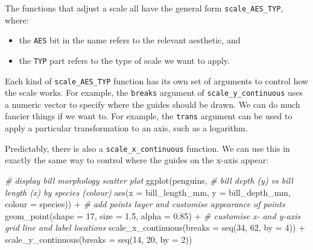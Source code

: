 \documentclass[
]{book}
\newenvironment{Shaded}{\begin{snugshade}}{\end{snugshade}}
\newcommand{\AttributeTok}[1]{\textcolor[rgb]{0.77,0.63,0.00}{#1}}
\newcommand{\CommentTok}[1]{\textcolor[rgb]{0.56,0.35,0.01}{\textit{#1}}}
\newcommand{\DecValTok}[1]{\textcolor[rgb]{0.00,0.00,0.81}{#1}}
\newcommand{\FloatTok}[1]{\textcolor[rgb]{0.00,0.00,0.81}{#1}}
\newcommand{\FunctionTok}[1]{\textcolor[rgb]{0.00,0.00,0.00}{#1}}
\newcommand{\NormalTok}[1]{#1}
\newcommand{\SpecialCharTok}[1]{\textcolor[rgb]{0.00,0.00,0.00}{#1}}
\providecommand{\tightlist}{%
  \setlength{\itemsep}{0pt}\setlength{\parskip}{0pt}}
\begin{document}
The functions that adjust a scale all have the general form \texttt{scale\_AES\_TYP}, where:

\begin{itemize}
\tightlist
\item
  the \texttt{AES} bit in the name refers to the relevant aesthetic, and
\item
  the \texttt{TYP} part refers to the type of scale we want to apply.
\end{itemize}

Each kind of \texttt{scale\_AES\_TYP} function has its own set of arguments to control how the scale works. For example, the \texttt{breaks} argument of \texttt{scale\_y\_continuous} uses a numeric vector to specify where the guides should be drawn. We can do much fancier things if we want to. For example, the \texttt{trans} argument can be used to apply a particular transformation to an axis, such as a logarithm.

Predictably, there is also a \texttt{scale\_x\_continuous} function. We can use this in exactly the same way to control where the guides on the x-axis appear:

\begin{Shaded}
\begin{Highlighting}[]
\CommentTok{\# display bill morphology scatter plot}
\FunctionTok{ggplot}\NormalTok{(penguins, }
       \CommentTok{\# bill depth (y) vs bill length (x) by species (colour)}
       \FunctionTok{aes}\NormalTok{(}\AttributeTok{x =}\NormalTok{ bill\_length\_mm, }\AttributeTok{y =}\NormalTok{ bill\_depth\_mm, }\AttributeTok{colour =}\NormalTok{ species)) }\SpecialCharTok{+} 
  \CommentTok{\# add points layer and customise appearance of points}
  \FunctionTok{geom\_point}\NormalTok{(}\AttributeTok{shape =} \DecValTok{17}\NormalTok{, }\AttributeTok{size =} \FloatTok{1.5}\NormalTok{, }\AttributeTok{alpha =} \FloatTok{0.85}\NormalTok{) }\SpecialCharTok{+} 
  \CommentTok{\# customise x{-} and y{-}axis grid line and label locations}
  \FunctionTok{scale\_x\_continuous}\NormalTok{(}\AttributeTok{breaks =} \FunctionTok{seq}\NormalTok{(}\DecValTok{34}\NormalTok{, }\DecValTok{62}\NormalTok{, }\AttributeTok{by =} \DecValTok{4}\NormalTok{)) }\SpecialCharTok{+}
  \FunctionTok{scale\_y\_continuous}\NormalTok{(}\AttributeTok{breaks =} \FunctionTok{seq}\NormalTok{(}\DecValTok{14}\NormalTok{, }\DecValTok{20}\NormalTok{, }\AttributeTok{by =} \DecValTok{2}\NormalTok{))}
\end{Highlighting}
\end{Shaded}
\end{document}
